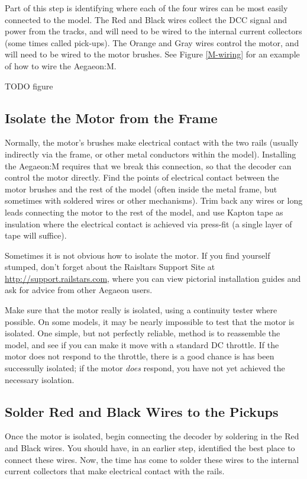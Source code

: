 \documentclass[12pt,letterpaper,draft]{memoir} %
\begin{document}
Part of this step is identifying where each of the four wires can be most easily connected to the model. The Red and Black wires collect the DCC signal and power from the tracks, and will need to be wired to the internal current collectors (some times called pick-ups). The Orange and Gray wires control the motor, and will need to be wired to the motor brushes. See Figure \ref{M-wiring} for an example of how to wire the Aegaeon:M.

TODO figure \label{M-wiring}

\subsection{Isolate the Motor from the Frame}
Normally, the motor's brushes make electrical contact with the two rails (usually indirectly via the frame, or other metal conductors within the model). Installing the Aegaeon:M requires that we break this connection, so that the decoder can control the motor directly. Find the points of electrical contact between the motor brushes and the rest of the model (often inside the metal frame, but sometimes with soldered wires or other mechanisms). Trim back any wires or long leads connecting the motor to the rest of the model, and use Kapton tape as insulation where the electrical contact is achieved via press-fit (a single layer of tape will suffice).

Sometimes it is not obvious how to isolate the motor. If you find yourself stumped, don't forget about the Raisltars Support Site at \url{http://support.railstars.com}, where you can view pictorial installation guides and ask for advice from other Aegaeon users.

Make sure that the motor really is isolated, using a continuity tester where possible. On some models, it may be nearly impossible to test that the motor is isolated. One simple, but not perfectly reliable, method is to reassemble the model, and see if you can make it move with a standard DC throttle. If the motor does not respond to the throttle, there is a good chance is has been successully isolated; if the motor \textit{does} respond, you have not yet achieved the necessary isolation.

\subsection{Solder Red and Black Wires to the Pickups}
Once the motor is isolated, begin connecting the decoder by soldering in the Red and Black wires. You should have, in an earlier step, identified the best place to connect these wires. Now, the time has come to solder these wires to the internal current collectors that make electrical contact with the rails.
\end{document}
